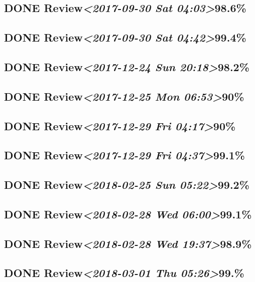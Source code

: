 \documentclass[11pt]{ctexart}
\begin{document}
\subsection{{\bfseries\sffamily DONE} Review\textit{<2017-09-30 Sat 04:03>}98.6\%}
\label{sec:orgfbb3ac9}
\subsection{{\bfseries\sffamily DONE} Review\textit{<2017-09-30 Sat 04:42>}99.4\%}
\label{sec:org74f0e89}

\subsection{{\bfseries\sffamily DONE} Review\textit{<2017-12-24 Sun 20:18>}98.2\%}
\label{sec:org6dfb8b2}
\subsection{{\bfseries\sffamily DONE} Review\textit{<2017-12-25 Mon 06:53>}90\%}
\label{sec:org7c5800b}
\subsection{{\bfseries\sffamily DONE} Review\textit{<2017-12-29 Fri 04:17>}90\%}
\label{sec:org73bcd8f}
\subsection{{\bfseries\sffamily DONE} Review\textit{<2017-12-29 Fri 04:37>}99.1\%}
\label{sec:org0287bad}
\subsection{{\bfseries\sffamily DONE} Review\textit{<2018-02-25 Sun 05:22>}99.2\%}
\label{sec:org120ef10}
\subsection{{\bfseries\sffamily DONE} Review\textit{<2018-02-28 Wed 06:00>}99.1\%}
\label{sec:org6c81815}
\subsection{{\bfseries\sffamily DONE} Review\textit{<2018-02-28 Wed 19:37>}98.9\%}
\label{sec:orgc54cb15}
\subsection{{\bfseries\sffamily DONE} Review\textit{<2018-03-01 Thu 05:26>}99.\%}
\label{sec:orga557bd0}
\end{document}
